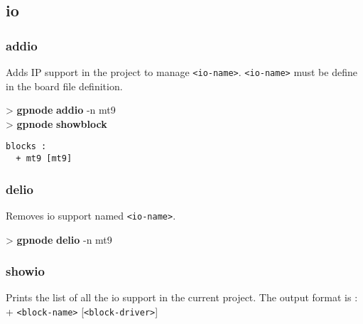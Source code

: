\documentclass[10pt,a4paper]{article}
\begin{document}
\subsection{io}
\subsubsection{addio}

Adds IP support in the project to manage \texttt{<io-name>}. \texttt{<io-name>} must be define in the board file definition.


\begin{sampletitle}
> \textbf{gpnode} \textbf{addio} -n mt9\\
> \textbf{gpnode} \textbf{showblock}
\begin{Verbatim}
blocks :
  + mt9 [mt9]
\end{Verbatim}
\end{sampletitle}


\subsubsection{delio}

Removes io support named \texttt{<io-name>}.


\begin{sampletitle}
> \textbf{gpnode} \textbf{delio} -n mt9
\end{sampletitle}


\subsubsection{showio}

Prints the list of all the io support in the current project. The output format is : + \texttt{<block-name>} [\texttt{<block-driver>}]
\end{document}

